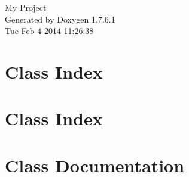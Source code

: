 \documentclass[a4paper]{book}
\begin{document}
\hypersetup{pageanchor=false,citecolor=blue}
\begin{titlepage}
\vspace*{7cm}
\begin{center}
{\Large \-My \-Project }\\
\vspace*{1cm}
{\large \-Generated by Doxygen 1.7.6.1}\\
\vspace*{0.5cm}
{\small Tue Feb 4 2014 11:26:38}\\
\end{center}
\end{titlepage}
\clearemptydoublepage
{}
\tableofcontents
\clearemptydoublepage
{}
\hypersetup{pageanchor=true,citecolor=blue}
\chapter{\-Class \-Index}

\chapter{\-Class \-Index}

\chapter{\-Class \-Documentation}


































\printindex
\end{document}
